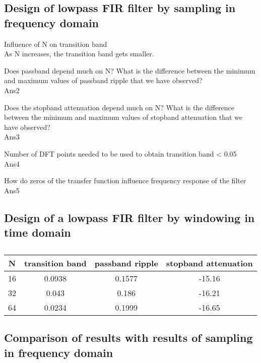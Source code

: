 \documentclass{article}
\begin{document}
\subsection*{Design of lowpass FIR filter by sampling in frequency domain}
Influence of N on transition band \\
As N increases, the transition band gets smaller.

Does passband depend much on N? What is the difference between
the minimum and maximum values of passband ripple that we have
observed? \\
Ans2

Does the stopband attenuation depend much on N? What is the difference between 
the minimum and maximum values of stopband attenuation that we have observed? \\
Ans3

Number of DFT points needed to be used to obtain transition band < 0.05 \\
Ans4

How do zeros of the transfer function influence frequency response of the filter \\
Ans5

\subsection*{Design of a lowpass FIR filter by windowing in time domain}

\begin{table}[h!]
  \begin{center}
    \caption{}
    \label{tab:task1tab}
    \begin{tabular}{c|c|c|c} 
      \textbf{N} & \textbf{transition band} & \textbf{passband ripple} 
      & \textbf{stopband attenuation} \\
      \hline
        16 & 0.0938 & 0.1577 & -15.16 \\
        32 & 0.043  & 0.186  & -16.21 \\
        64 & 0.0234 & 0.1999 & -16.65 \\
    \end{tabular}
  \end{center}
\end{table}

\subsection*{Comparison of results with results of sampling in frequency domain}
\end{document}
